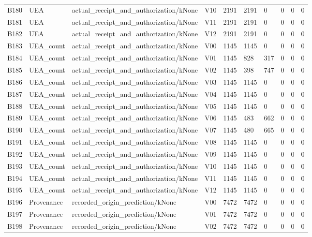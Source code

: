 \begin{longtable}{llllllllll}
B180 & UEA & actual\_receipt\_and\_authorization/kNone & V10 & 2191 & 2191 & 0 & 0 & 0 & 0 \\
B181 & UEA & actual\_receipt\_and\_authorization/kNone & V11 & 2191 & 2191 & 0 & 0 & 0 & 0 \\
B182 & UEA & actual\_receipt\_and\_authorization/kNone & V12 & 2191 & 2191 & 0 & 0 & 0 & 0 \\
B183 & UEA\_count & actual\_receipt\_and\_authorization/kNone & V00 & 1145 & 1145 & 0 & 0 & 0 & 0 \\
B184 & UEA\_count & actual\_receipt\_and\_authorization/kNone & V01 & 1145 & 828 & 317 & 0 & 0 & 0 \\
B185 & UEA\_count & actual\_receipt\_and\_authorization/kNone & V02 & 1145 & 398 & 747 & 0 & 0 & 0 \\
B186 & UEA\_count & actual\_receipt\_and\_authorization/kNone & V03 & 1145 & 1145 & 0 & 0 & 0 & 0 \\
B187 & UEA\_count & actual\_receipt\_and\_authorization/kNone & V04 & 1145 & 1145 & 0 & 0 & 0 & 0 \\
B188 & UEA\_count & actual\_receipt\_and\_authorization/kNone & V05 & 1145 & 1145 & 0 & 0 & 0 & 0 \\
B189 & UEA\_count & actual\_receipt\_and\_authorization/kNone & V06 & 1145 & 483 & 662 & 0 & 0 & 0 \\
B190 & UEA\_count & actual\_receipt\_and\_authorization/kNone & V07 & 1145 & 480 & 665 & 0 & 0 & 0 \\
B191 & UEA\_count & actual\_receipt\_and\_authorization/kNone & V08 & 1145 & 1145 & 0 & 0 & 0 & 0 \\
B192 & UEA\_count & actual\_receipt\_and\_authorization/kNone & V09 & 1145 & 1145 & 0 & 0 & 0 & 0 \\
B193 & UEA\_count & actual\_receipt\_and\_authorization/kNone & V10 & 1145 & 1145 & 0 & 0 & 0 & 0 \\
B194 & UEA\_count & actual\_receipt\_and\_authorization/kNone & V11 & 1145 & 1145 & 0 & 0 & 0 & 0 \\
B195 & UEA\_count & actual\_receipt\_and\_authorization/kNone & V12 & 1145 & 1145 & 0 & 0 & 0 & 0 \\
B196 & Provenance & recorded\_origin\_prediction/kNone & V00 & 7472 & 7472 & 0 & 0 & 0 & 0 \\
B197 & Provenance & recorded\_origin\_prediction/kNone & V01 & 7472 & 7472 & 0 & 0 & 0 & 0 \\
B198 & Provenance & recorded\_origin\_prediction/kNone & V02 & 7472 & 7472 & 0 & 0 & 0 & 0 \\

\end{longtable}
